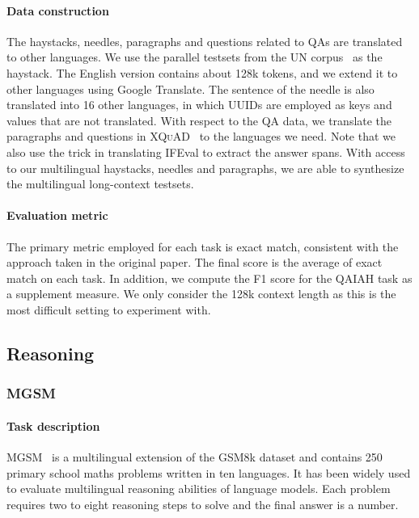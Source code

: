 \paragraph{Data construction}
The haystacks, needles, paragraphs and questions related to QAs are translated to other languages.
We use the parallel testsets from the UN corpus~\cite{ziemski2016united} as the haystack.
The English version contains about 128k tokens, and we extend it to other languages using Google Translate.
The sentence of the needle is also translated into 16 other languages, in which UUIDs are employed as keys and values that are not translated.
With respect to the QA data, we translate the paragraphs and questions in \textsc{XQuAD}~\cite{artetxe2020cross} to the languages we need.
Note that we also use the trick in translating IFEval to extract the answer spans.
With access to our multilingual haystacks, needles and paragraphs, we are able to synthesize the multilingual long-context testsets.

\paragraph{Evaluation metric}
The primary metric employed for each task is exact match, consistent with the approach taken in the original paper.
The final score is the average of exact match on each task.
In addition, we compute the F1 score for the QAIAH task as a supplement measure.
We only consider the 128k context length as this is the most difficult setting to experiment with.

\subsection{Reasoning}
\subsubsection{MGSM}
\paragraph{Task description}
MGSM~\cite{shi2023language} is a multilingual extension of the GSM8k dataset and contains 250 primary school maths problems written in ten languages.
It has been widely used to evaluate multilingual reasoning abilities of language models.
Each problem requires two to eight reasoning steps to solve and the final answer is a number.

